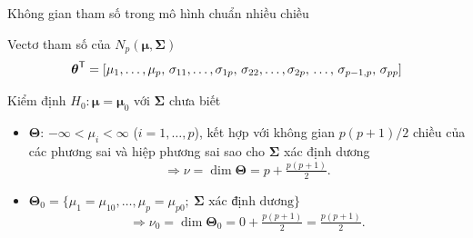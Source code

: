 \begin{frame}[t]{Không gian tham số trong mô hình chuẩn nhiều chiều}
  \begin{block}{Vectơ tham số của $N_p(\boldsymbol{\mu}, \boldsymbol{\Sigma})$}
    \[
      \boldsymbol{\theta}^{\mathsf T} = [\mu_1, \dots, \mu_p,\, \sigma_{11}, \dots, \sigma_{1p},\, \sigma_{22}, \dots, \sigma_{2p},\, \dots,\, \sigma_{p-1,p},\, \sigma_{pp}]
    \]
  \end{block}

  \begin{exampleblock}{Kiểm định $H_0: \boldsymbol{\mu} = \boldsymbol{\mu}_0$ với $\boldsymbol{\Sigma}$ chưa biết}
    \begin{itemize}
      \setlength{\itemsep}{6pt}
      \item $\boldsymbol{\Theta}$: $-\infty < \mu_i < \infty$ ($i = 1, \dots, p$), kết hợp với không gian $p(p+1)/2$ chiều của các phương sai và hiệp phương sai sao cho $\boldsymbol{\Sigma}$ xác định dương
      \[
        \Rightarrow \nu = \dim\boldsymbol{\Theta} = p + \tfrac{p(p+1)}{2}.
      \]
      \item $\boldsymbol{\Theta}_0 = \{\mu_1 = \mu_{10}, \dots, \mu_p = \mu_{p0};\ \boldsymbol{\Sigma} \text{ xác định dương}\}$
      \[
        \Rightarrow \nu_0 = \dim\boldsymbol{\Theta}_0 = 0 + \tfrac{p(p+1)}{2} = \tfrac{p(p+1)}{2}.
      \]
    \end{itemize}
  \end{exampleblock}
\end{frame}

